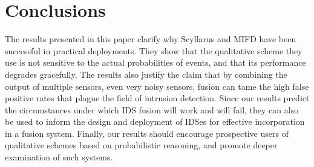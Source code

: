 
\section{Conclusions}
\label{sec:conclusions}

The results presented in this paper clarify why Scyllarus and
MIFD have been successful in practical deployments.
They show that the qualitative scheme they use is not sensitive to
the actual probabilities of events, and that its performance degrades
gracefully.
The results also justify the claim that by combining the output of multiple sensors, even
very noisy sensors, \ids fusion can tame the high false
positive rates that plague the field of intrusion detection.
Since our results predict the circumstances under which IDS fusion will work and
will fail, they can also be used to inform the design and deployment of IDSes
for effective incorporation in a fusion system.
Finally, our results should encourage prospective users
of qualitative schemes based on probabilistic reasoning,
and promote deeper examination of %
such systems.


